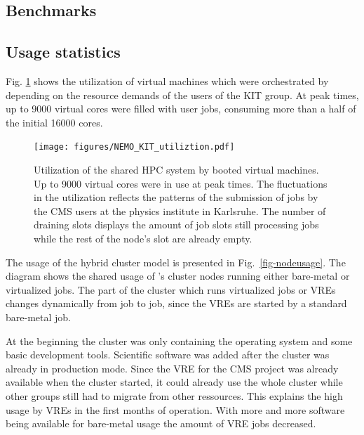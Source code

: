 \subsection{Benchmarks}




%
%
%
\subsection{Usage statistics}
Fig. \ref{fig-frplots} shows the utilization of virtual machines which were orchestrated by \Roced depending on the resource demands of the users of the KIT group.
At peak times, up to 9000 virtual cores were filled with user jobs, consuming more than a half of the initial 16000 \NEMO cores.

\begin{figure}
\begin{center}
  \texttt{[image: figures/NEMO\_KIT\_utiliztion.pdf]}
  \caption{Utilization of the shared HPC system by booted virtual machines. Up to 9000 virtual cores were in use at peak times. The fluctuations in the utilization reflects the patterns of the submission of jobs by the CMS users at the physics institute in Karlsruhe. The number of draining slots displays the amount of job slots still processing jobs while the rest of the node's slot are already empty.}
  \label{fig-frplots}
\end{center}
\end{figure}

The usage of the hybrid cluster model is presented in Fig.~\ref{fig-nodeusage}.
The diagram shows the shared usage of \NEMO's cluster nodes running either
bare-metal or virtualized jobs. The part of the cluster which runs virtualized
jobs or VREs changes dynamically from job to job, since the VREs are started by
a standard bare-metal job.

At the beginning the cluster was only containing the operating system and some
basic development tools. Scientific software was added after the cluster was
already in production mode. Since the VRE for the CMS project was already
available when the \NEMO cluster started, it could already use the whole cluster
while other groups still had to migrate from other ressources. This explains the high usage by VREs in the first months of
operation. With more and more software being available for bare-metal usage the
amount of VRE jobs decreased.

